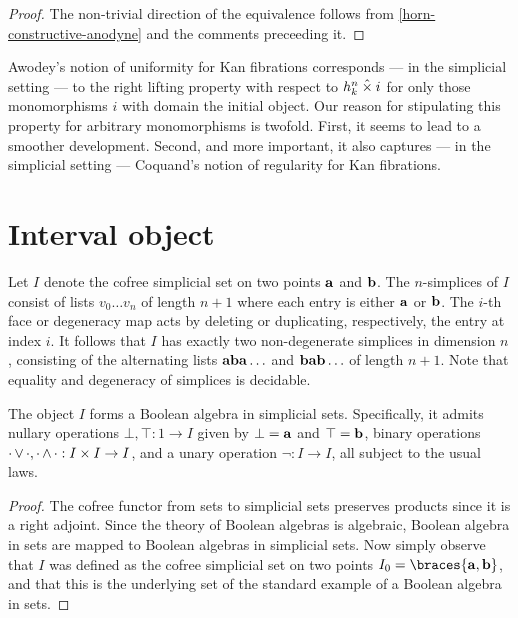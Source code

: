 \documentclass[reqno,10pt,a4paper,oneside]{amsart}
\begin{document}
\begin{proof}
The non-trivial direction of the equivalence follows from \cref{horn-constructive-anodyne} and the comments preceeding it.
\end{proof}

Awodey's notion of uniformity for Kan fibrations corresponds --- in the simplicial setting --- to the right lifting property with respect to $h_k^n \mathbin{\hat{\times}} i$ for only those monomorphisms $i$ with domain the initial object.
Our reason for stipulating this property for arbitrary monomorphisms is twofold.
First, it seems to lead to a smoother development.
Second, and more important, it also captures --- in the simplicial setting --- Coquand's notion of regularity for Kan fibrations.
\section{Interval object}

Let $I$ denote the cofree simplicial set on two points $\mathbf{a}$ and $\mathbf{b}$.
The $n$-simplices of $I$ consist of lists $v_0 \ldots v_n$ of length $n+1$ where each entry is either $\mathbf{a}$ or $\mathbf{b}$.
The $i$-th face or degeneracy map acts by deleting or duplicating, respectively, the entry at index $i$.
It follows that $I$ has exactly two non-degenerate simplices in dimension $n$, consisting of the alternating lists $\mathbf{a} \mathbf{b} \mathbf{a} \ldots$ and $\mathbf{b} \mathbf{a} \mathbf{b} \ldots$ of length $n+1$.
Note that equality and degeneracy of simplices is decidable.

\begin{lemma}
The object $I$ forms a Boolean algebra in simplicial sets.
Specifically, it admits nullary operations $\bot, \top : 1 \to I$ given by $\bot = \mathbf{a}$ and $\top = \mathbf{b}$, binary operations $\mathop{\cdot} \vee \mathop{\cdot}, \mathop{\cdot} \wedge \mathop{\cdot} : I \times I \to I$, and a unary operation $\neg : I \to I$, all subject to the usual laws.
\end{lemma}

\begin{proof}
The cofree functor from sets to simplicial sets preserves products since it is a right adjoint.
Since the theory of Boolean algebras is algebraic, Boolean algebra in sets are mapped to Boolean algebras in simplicial sets.
Now simply observe that $I$ was defined as the cofree simplicial set on two points $I_0 = \braces{\ptA, \ptB}$, and that this is the underlying set of the standard example of a Boolean algebra in sets.
\end{proof}
\end{document}
